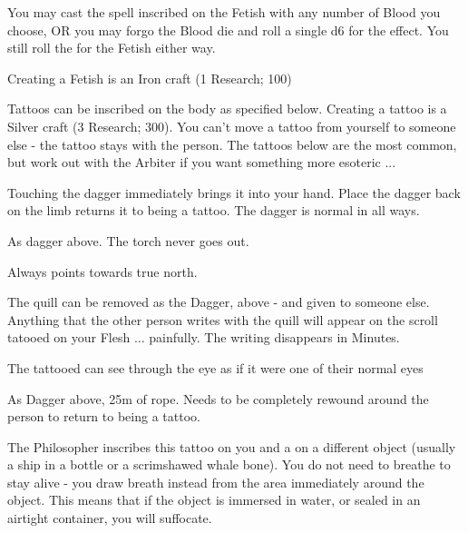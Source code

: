 {You may cast the spell inscribed on the Fetish with any number of Blood you choose, OR you may forgo the Blood die and roll a single d6 for the effect.  You still roll the \UD for the Fetish either way.

Creating a Fetish is an Iron craft (1 Research; 100\FE)



Tattoos can be inscribed on the body as specified below.  Creating a tattoo is a Silver craft (3 Research; 300\AG).  You can't move a tattoo from yourself to someone else - the tattoo stays with the person.  The tattoos below are the most common, but work out with the Arbiter if you want something more esoteric ...


Touching the dagger immediately brings it into your hand.  Place the dagger back on the limb returns it to being a tattoo.  The dagger is normal in all ways.


As dagger above.  The torch never goes out.


Always points towards true north.  


The quill can be removed as the Dagger, above - and given to someone else.  Anything that the other person writes with the quill will appear on the scroll tatooed on your Flesh ... painfully.  The writing disappears in Minutes.


The tattooed can see through the eye as if it were one of their normal eyes


As Dagger above, 25m of rope. Needs to be completely rewound around the person to return to being a tattoo.



The Philosopher inscribes this tattoo on you and a  on a different object (usually a ship in a bottle or a scrimshawed whale bone).  You do not need to breathe to stay alive - you draw breath instead from the area immediately around the object.  This means that if the object is immersed in water, or sealed in an airtight container, you will suffocate.

}
